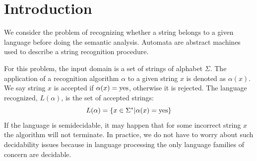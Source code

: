 \section{Introduction}

We consider the problem of recognizing whether a string belongs to a given language before doing the semantic analysis.
Automata are abstract machines used to describe a string recognition procedure. 

For this problem, the input domain is a set of strings of alphabet $\Sigma$. 
The application of a recognition algorithm $\alpha$ to a given string $x$ is denoted as $\alpha(x)$.
We say string $x$ is accepted if $\alpha(x)=\textnormal{yes}$, otherwise it is rejected.
The language recognized, $L(\alpha)$, is the set of accepted strings:
\[L(\alpha)=\{x \in \Sigma^{*}|\alpha(x)=\textnormal{yes}\}\]
If the language is semidecidable, it may happen that for some incorrect string $x$ the algorithm will not terminate. 
In practice, we do not have to worry about such decidability issues because in language processing the only language families of concern are decidable. 

